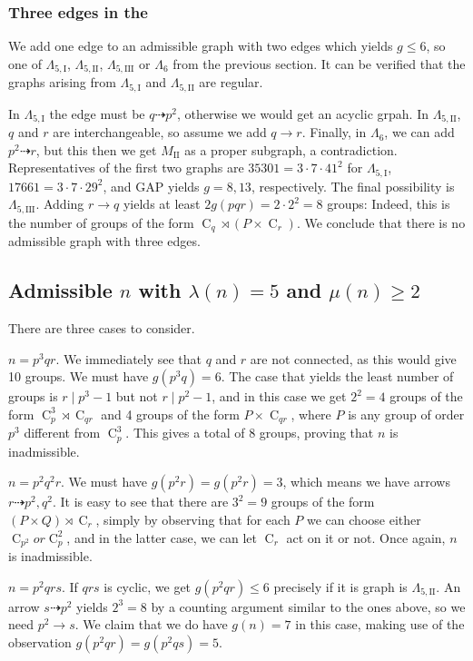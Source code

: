 \documentclass[draft]{article}
\newcommand{\cyc}[1]{\operatorname{C}_{#1}}
\newcommand{\qlame}{\Lambda_{5,\text{I}}}
\newcommand{\qlamz}{\Lambda_{5,\text{II}}}
\newcommand{\qlamd}{\Lambda_{5,\text{III}}}
\theoremstyle{plain}
\theoremstyle{definition}
\begin{document}
\subsubsection*{Three edges in the \hg}
We add one edge to an admissible graph with two edges which yields $g \le 6$, so one of $\qlame$, $\qlamz$, $\qlamd$ or $\Lambda_{6}$ from the previous section. It can be verified that the graphs arising from $\qlame$ and $\qlamz$ are regular.

In $\qlame$ the edge must be $q \dashrightarrow p^2$, otherwise we would get an acyclic grpah. In $\qlamz$, $q$ and $r$ are interchangeable, so assume we add $q \rightarrow r$. Finally, in $\Lambda_6$, we can add $p^2 \dashrightarrow r$, but this then we get $M_\text{II}$ as a proper subgraph, a contradiction. Representatives of the first two graphs are $35301 = 3\cdot7\cdot41^2$ for $\qlame$, $17661 = 3\cdot7\cdot29^2$, and GAP yields $g = 8, 13$, respectively. The final possibility is $\qlamd$. 
Adding $r \rightarrow q$ yields at least $2g(pqr) = 2 \cdot 2^2 = 8$ groups: Indeed, this is the number of groups of the form $\cyc{q} \rtimes (P \times \cyc{r})$. We conclude that there is no admissible graph with three edges.


\subsection{Admissible $n$ with $\lambda(n) = 5$ and $\mu(n) \ge 2$} 
There are three cases to consider.

 $n = p^3 q r$. We immediately see that $q$ and $r$ are not connected, as this would give 10 groups. We must have $g(p^3 q) = 6$. The case that yields the least number of groups is $r \mid p^3 - 1$ but not $r \mid p^2 - 1$, and in this case we get $2^2 = 4$ groups of the form $\cyc{p}^3 \rtimes \cyc{qr}$ and 4 groups of the form $P \times \cyc{qr}$, where $P$ is any group of order $p^3$ different from $\cyc{p}^3$. This gives a total of 8 groups, proving that $n$ is inadmissible.

 $n = p^2 q^2 r$. We must have $g(p^2 r) = g(p^2 r) = 3$, which means we have arrows $r \dashrightarrow p^2, q^2$. It is easy to see that there are $3^2 = 9$ groups of the form $(P \times Q) \rtimes \cyc{r}$, simply by observing that for each $P$ we can choose either $\cyc{p^2} or \cyc{p}^2$, and in the latter case, we can let $\cyc{r}$ act on it or not. Once again, $n$ is inadmissible.
 
 $n = p^2 q r s$.
If $qrs$ is cyclic, we get $g(p^2 q r) \le 6$ precisely if it is graph is $\qlamz$. An arrow $s \dashrightarrow p^2$ yields $2^3 = 8$ by a counting argument similar to the ones above, so we need $p^2 \rightarrow s$. We claim that we do have $g(n) = 7$ in this case, making use of the observation $g(p^2 q r) = g(p^2 q s) = 5$.
\end{document}
